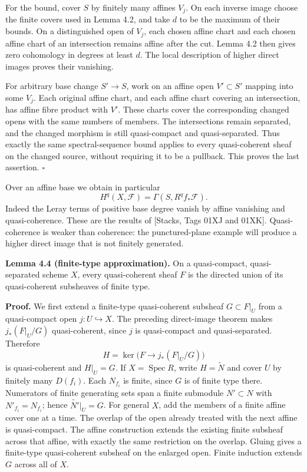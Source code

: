 \documentclass[11pt]{article}
\begin{document}
For the bound, cover \(S\) by finitely many affines \(V_j\). On each
inverse image choose the finite covers used in Lemma 4.2, and take \(d\)
to be the maximum of their bounds. On a distinguished open of \(V_j\),
each chosen affine chart and each chosen affine chart of an intersection
remains affine after the cut. Lemma 4.2 then gives zero cohomology in
degrees at least \(d\). The local description of higher direct images
proves their vanishing.

For arbitrary base change \(S'\to S\), work on an affine open
\(V'\subset S'\) mapping into some \(V_j\). Each original affine chart,
and each affine chart covering an intersection, has affine fibre product
with \(V'\). These charts cover the corresponding changed opens with the
same numbers of members. The intersections remain separated, and the
changed morphism is still quasi-compact and quasi-separated. Thus
exactly the same spectral-sequence bound applies to every quasi-coherent
sheaf on the changed source, without requiring it to be a pullback. This
proves the last assertion. \(\square\)

Over an affine base we obtain in particular \[
H^q(X,\mathcal F)=\Gamma(S,R^qf_*\mathcal F).
\] Indeed the Leray terms of positive base degree vanish by affine
vanishing and quasi-coherence. These are the results of {[}Stacks, Tags
01XJ and 01XK{]}. Quasi-coherence is weaker than coherence: the
punctured-plane example will produce a higher direct image that is not
finitely generated.

\textbf{Lemma 4.4 (finite-type approximation).} On a quasi-compact,
quasi-separated scheme \(X\), every quasi-coherent sheaf \(F\) is the
directed union of its quasi-coherent subsheaves of finite type.

\textbf{Proof.} We first extend a finite-type quasi-coherent subsheaf
\(G\subset F|_U\) from a quasi-compact open \(j:U\hookrightarrow X\).
The preceding direct-image theorem makes \(j_*(F|_U/G)\) quasi-coherent,
since \(j\) is quasi-compact and quasi-separated. Therefore \[
H=\ker\bigl(F\longrightarrow j_*(F|_U/G)\bigr)
\] is quasi-coherent and \(H|_U=G\). If \(X=\operatorname{Spec}R\),
write \(H=\widetilde N\) and cover \(U\) by finitely many \(D(f_i)\).
Each \(N_{f_i}\) is finite, since \(G\) is of finite type there.
Numerators of finite generating sets span a finite submodule
\(N'\subset N\) with \(N'_{f_i}=N_{f_i}\); hence
\(\widetilde{N'}|_U=G\). For general \(X\), add the members of a finite
affine cover one at a time. The overlap of the open already treated with
the next affine is quasi-compact. The affine construction extends the
existing finite subsheaf across that affine, with exactly the same
restriction on the overlap. Gluing gives a finite-type quasi-coherent
subsheaf on the enlarged open. Finite induction extends \(G\) across all
of \(X\).
\end{document}
